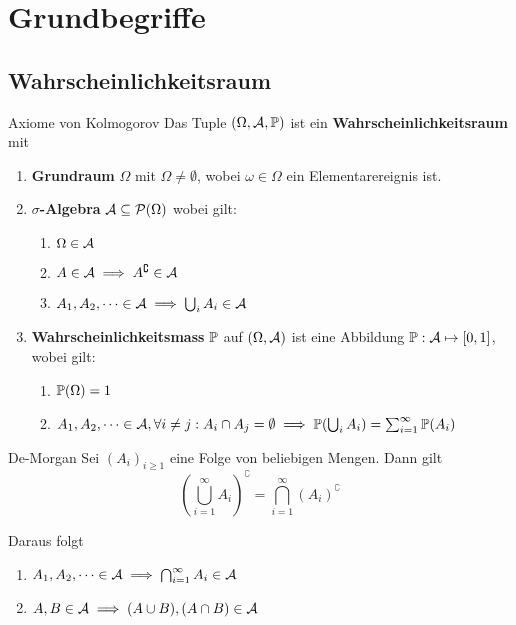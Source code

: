 \section{Grundbegriffe}
\subsection{Wahrscheinlichkeitsraum}
\begin{mainbox}{Axiome von Kolmogorov}
    Das Tuple $(\Omega, \A, \P)$ ist ein \textbf{Wahrscheinlichkeitsraum} mit 
    \begin{enumerate}[label=\Roman*.]
        \item \textbf{Grundraum} $\Omega$ mit $\Omega \neq \emptyset$, wobei $\omega \in \Omega$ ein Elementarereignis ist.
        \item \textbf{$\sigma$-Algebra} $\A \subseteq \Pset(\Omega)$ wobei gilt:
        \begin{enumerate}[label=\arabic*.]
            \item $\Omega \in \A$
            \item $A \in \A \implies A^\complement \in \A$
            \item $A_1,A_2,\dots \in \A \implies \bigcup_i A_i \in \A$
        \end{enumerate}
        \item \textbf{Wahrscheinlichkeitsmass} $\P$ auf $(\Omega, \A)$ ist eine Abbildung $\P: \A \mapsto [0,1]$, wobei gilt:
        \begin{enumerate}[label=\arabic*.]
            \item $\P(\Omega) = 1$
            \item $A_1, A_2, \dots \in \A, \forall i \neq j: A_i \cap A_j = \emptyset \\ \implies \P(\bigcup_i A_i) = \sum_{i= 1}^\infty \P(A_i)$
        \end{enumerate}
    \end{enumerate}
\end{mainbox}
\begin{subbox}{De-Morgan}
    Sei $(A_i)_{i \geq 1}$ eine Folge von beliebigen Mengen. Dann gilt
    $$\left(\bigcup_{i = 1}^{\infty}A_i\right)^\complement = \bigcap_{i = 1}^{\infty} (A_i)^\complement$$
\end{subbox}
Daraus folgt
\begin{enumerate}[label=\arabic*.]
    \item $A_1,A_2, \dots \in \A \implies \bigcap_{i=1}^{\infty}A_i \in \A$
    \item $A,B \in \A \implies (A \cup B), (A \cap B) \in \A$
\end{enumerate}

